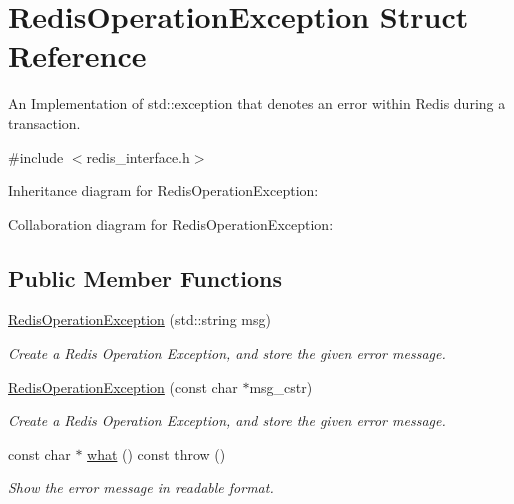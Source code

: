 \hypertarget{structRedisOperationException}{}\section{Redis\+Operation\+Exception Struct Reference}
\label{structRedisOperationException}


An Implementation of std\+::exception that denotes an error within Redis during a transaction.  




{\ttfamily \#include $<$redis\+\_\+interface.\+h$>$}



Inheritance diagram for Redis\+Operation\+Exception\+:


Collaboration diagram for Redis\+Operation\+Exception\+:
\subsection*{Public Member Functions}
\begin{DoxyCompactItemize}
\item 
\hyperlink{structRedisOperationException_a54e07b6a7c4d81ab0cb4d1f61d5a6226}{Redis\+Operation\+Exception} (std\+::string msg)\hypertarget{structRedisOperationException_a54e07b6a7c4d81ab0cb4d1f61d5a6226}{}\label{structRedisOperationException_a54e07b6a7c4d81ab0cb4d1f61d5a6226}

\begin{DoxyCompactList}\small\item\em Create a Redis Operation Exception, and store the given error message. \end{DoxyCompactList}\item 
\hyperlink{structRedisOperationException_a330513962eb439159cf494f3996edc8c}{Redis\+Operation\+Exception} (const char $\ast$msg\+\_\+cstr)\hypertarget{structRedisOperationException_a330513962eb439159cf494f3996edc8c}{}\label{structRedisOperationException_a330513962eb439159cf494f3996edc8c}

\begin{DoxyCompactList}\small\item\em Create a Redis Operation Exception, and store the given error message. \end{DoxyCompactList}\item 
const char $\ast$ \hyperlink{structRedisOperationException_a629e013517496f9e14ae5286a8759043}{what} () const   throw ()\hypertarget{structRedisOperationException_a629e013517496f9e14ae5286a8759043}{}\label{structRedisOperationException_a629e013517496f9e14ae5286a8759043}

\begin{DoxyCompactList}\small\item\em Show the error message in readable format. \end{DoxyCompactList}\end{DoxyCompactItemize}

